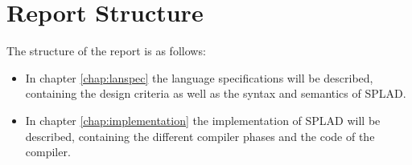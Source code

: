 \section{Report Structure}
The structure of the report is as follows:
\begin{itemize}
	\item In chapter \ref{chap:lanspec} the language specifications will be described, containing the design criteria as well as the syntax and semantics of SPLAD.
	\item In chapter \ref{chap:implementation} the implementation of SPLAD will be described, containing the different compiler phases and the code of the compiler.
\end{itemize}